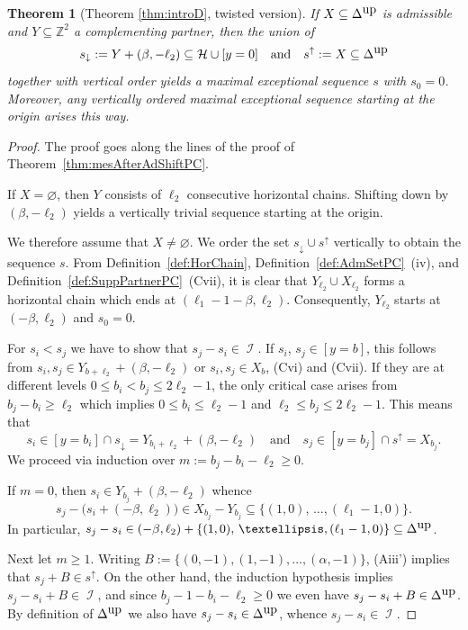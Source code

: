 \documentclass[11pt]{article}
\newtheorem{theorem}[theo]{Theorem}
\theoremstyle{definition}
\numberwithin{equation}{section}
\newcommand{\cH}{\mathcal{H}}
\newcommand{\Z}{\mathbb Z}
\newcommand{\CI}{{\mathcal I}}
\newcommand{\nImm}{\operatorname{\CI}}
\newcommand{\xa}{\alpha}
\newcommand{\xb}{\beta}
\newcommand{\cl}{s}
\newcommand{\clDown}{s_{\downarrow}}
\newcommand{\clUp}{s^{\uparrow}}
\newcommand{\DeltaUp}{\Delta^{\mbox{\tiny up}}}
\newcommand{\mes}{maximal exceptional sequence}
\newcommand{\thClass}{\ref{thm:introD}}
\begin{document}
\begin{theorem}[Theorem {\thClass}, twisted version]
\label{thm:mesAfterAdShift}
If $X\subseteq \DeltaUp$ is 
admissible and $Y\subseteq \Z^2$ a 
complementing partner, then the union of
$$
\clDown:=Y+(\xb,-\ell_2)\subseteq\cH\cup[y=0] 
\quad\mbox{and}\quad 
\clUp:=X\subseteq\DeltaUp
$$
together with vertical order yields a 
{\mes} $\cl$ with $\cl_0=0$. {Moreover, any
vertically ordered {\mes} starting at the origin 
arises this way.}
\end{theorem}

\begin{proof}
The proof goes along the lines of the
proof of Theorem~\ref{thm:mesAfterAdShiftPC}.

If $X=\varnothing$, then $Y$ consists of 
$\ell_2$ consecutive horizontal chains.
Shifting down by $(\xb,-\ell_2)$ yields 
a vertically trivial sequence starting 
at the origin. 

We therefore assume that $X\not=\varnothing$.
We order the set $\clDown\cup\clUp$ 
vertically to obtain the sequence $\cl$. 
From Definition~\ref{def:HorChain},
Definition~\ref{def:AdmSetPC}~(iv), and
Definition~\ref{def:SuppPartnerPC}~(Cvii), 
it is clear that $Y_{\ell_2}\cup X_{\ell_2}$ 
forms a horizontal chain which ends at 
$(\ell_1-1-\xb,\ell_2)$. Consequently, 
$Y_{\ell_2}$ starts at $(-\xb,\ell_2)$ 
and $\cl_0=0$.

For $\cl_i<\cl_j$ we have to show that 
$\cl_j-\cl_i\in\nImm$. 
If $\cl_i$, 
$\cl_j\in[y=b]$, this follows from
$\cl_i,\cl_j\in Y_{b+\ell_2}+(\xb,-\ell_2)$
or $\cl_i,\cl_j\in X_b$, (Cvi) 
and (Cvii). If they are at different levels 
$0\leq b_i<b_j\leq 2\ell_2-1$, the only
critical case arises from $b_j-b_i\geq \ell_2$
which implies $0\leq b_i\leq\ell_2-1$ and 
$\ell_2\leq b_j\leq2\ell_2-1$. This means that
$$
\cl_i\in[y=b_i]\cap\clDown=Y_{b_i+\ell_2}+(\xb,-\ell_2)
\quad\mbox{and}\quad\cl_j\in[y=b_j]\cap\clUp=X_{b_j}.
$$
We proceed via induction over $m:=b_j-b_i-
\ell_2\geq 0$. 

If $m=0$, then $\cl_i\in Y_{b_j}+(\xb,-\ell_2)$ 
whence
$$
\cl_j-\big(\cl_i+(-\xb,\ell_2)\big)\in X_{b_j}-Y_{b_j}\subseteq
\{(1,0),\,\ldots, (\ell_1-1,0)\}.
$$
In particular,  
$\cl_j-\cl_i\in (-\xb,\ell_2)+\{(1,0),\,\ldots,
(\ell_1-1,0)\}\subseteq\DeltaUp$.

Next let $m\geq 1$. Writing 
$B:=\{(0,-1),(1,-1),\ldots,(\xa,-1)\}$,
(Aiii') implies that
$\cl_j+B\in\clUp$. On the other hand,
the induction hypothesis implies $\cl_j-\cl_i+B
\in\nImm$, and since $b_j-1-b_i-\ell_2\geq0$
we even have $\cl_j-\cl_i+B\in\DeltaUp$.
By definition of $\DeltaUp$ we also have
$\cl_j-\cl_i\in\DeltaUp$, whence $\cl_j-\cl_i
\in\nImm$.


\end{proof}
\end{document}
